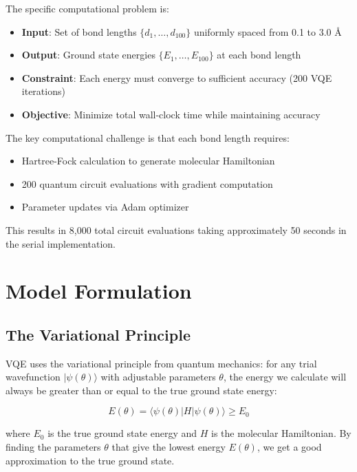 \documentclass[11pt]{article}
\begin{document}
The specific computational problem is:

\begin{itemize}
    \item \textbf{Input}: Set of bond lengths $\{d_1, \ldots, d_{100}\}$ uniformly spaced from 0.1 to 3.0 \AA
    \item \textbf{Output}: Ground state energies $\{E_1, \ldots, E_{100}\}$ at each bond length
    \item \textbf{Constraint}: Each energy must converge to sufficient accuracy (200 VQE iterations)
    \item \textbf{Objective}: Minimize total wall-clock time while maintaining accuracy
\end{itemize}

The key computational challenge is that each bond length requires:
\begin{itemize}
    \item Hartree-Fock calculation to generate molecular Hamiltonian
    \item 200 quantum circuit evaluations with gradient computation
    \item Parameter updates via Adam optimizer
\end{itemize}

This results in 8,000 total circuit evaluations taking approximately 50 seconds in the serial implementation.

\section{Model Formulation}

\subsection{The Variational Principle}

VQE uses the variational principle from quantum mechanics: for any trial wavefunction $|\psi(\theta)\rangle$ with adjustable parameters $\theta$, the energy we calculate will always be greater than or equal to the true ground state energy:

\begin{equation}
    E(\theta) = \langle \psi(\theta) | H | \psi(\theta) \rangle \geq E_0
\end{equation}

where $E_0$ is the true ground state energy and $H$ is the molecular Hamiltonian. By finding the parameters $\theta$ that give the lowest energy $E(\theta)$, we get a good approximation to the true ground state.
\end{document}
